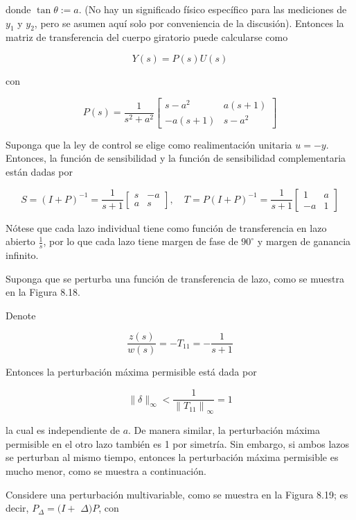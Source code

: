 donde $\tan \theta:=a$. (No hay un significado físico específico para las mediciones de $y_{1}$ y $y_{2}$, pero se asumen aquí solo por conveniencia de la discusión). Entonces la matriz de transferencia del cuerpo giratorio puede calcularse como

$$
Y(s)=P(s) U(s)
$$

con

$$
P(s)=\frac{1}{s^{2}+a^{2}}\left[\begin{array}{cc}
s-a^{2} & a(s+1) \\
-a(s+1) & s-a^{2}
\end{array}\right]
$$

Suponga que la ley de control se elige como realimentación unitaria $u=-y$. Entonces, la función de sensibilidad y la función de sensibilidad complementaria están dadas por

$$
S=(I+P)^{-1}=\frac{1}{s+1}\left[\begin{array}{cc}
s & -a \\
a & s
\end{array}\right], \quad T=P(I+P)^{-1}=\frac{1}{s+1}\left[\begin{array}{cc}
1 & a \\
-a & 1
\end{array}\right]
$$

Nótese que cada lazo individual tiene como función de transferencia en lazo abierto $\frac{1}{s}$, por lo que cada lazo tiene margen de fase de $90^{\circ}$ y margen de ganancia infinito.

Suponga que se perturba una función de transferencia de lazo, como se muestra en la Figura 8.18.


Denote

$$
\frac{z(s)}{w(s)}=-T_{11}=-\frac{1}{s+1}
$$

Entonces la perturbación máxima permisible está dada por

$$
\|\delta\|_{\infty}<\frac{1}{\left\|T_{11}\right\|_{\infty}}=1
$$

la cual es independiente de $a$. De manera similar, la perturbación máxima permisible en el otro lazo también es 1 por simetría. Sin embargo, si ambos lazos se perturban al mismo tiempo, entonces la perturbación máxima permisible es mucho menor, como se muestra a continuación.

Considere una perturbación multivariable, como se muestra en la Figura 8.19; es decir, $P_{\Delta}=(I+$ $\Delta) P$, con

